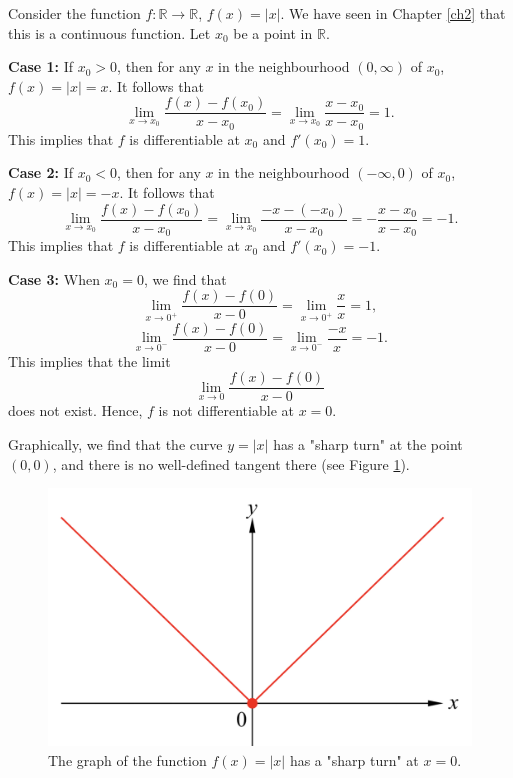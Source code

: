 \begin{example}[label=23021303]{}
Consider the function $f:\mathbb{R}\to\mathbb{R}$, $f(x)=|x|$. We have seen in Chapter \ref{ch2} that this is a continuous function. Let $x_0$ be a point in $\mathbb{R}$.

\textbf{Case 1:} If $x_0>0$, then for any $x$ in the neighbourhood $(0, \infty)$ of $x_0$, $f(x)=|x|=x$.  It follows that
\[\lim_{x\to x_0}\frac{f(x)-f(x_0)}{x-x_0}=\lim_{x\to x_0}\frac{x-x_0}{x-x_0}=1.\]
This implies that $f$ is differentiable at $x_0$ and $f'(x_0)=1$.

\textbf{Case 2:} If $x_0<0$, then for any $x$ in the neighbourhood $(-\infty, 0)$ of $x_0$, $f(x)=|x|=-x$.  It follows that 
\[\lim_{x\to x_0}\frac{f(x)-f(x_0)}{x-x_0}=\lim_{x\to x_0}\frac{-x-(-x_0)}{x-x_0}=-\frac{x-x_0}{x-x_0}=-1.\]
This implies that $f$ is differentiable at $x_0$ and $f'(x_0)=-1$.

\textbf{Case 3:} When $x_0=0$, we find that
\[\lim_{x\to 0^+}\frac{f(x)-f(0)}{x-0}=\lim_{x\to 0^+}\frac{x}{x}=1,\]
\[\lim_{x\to 0^-}\frac{f(x)-f(0)}{x-0}=\lim_{x\to 0^-}\frac{-x}{x}=-1.\]
This implies that the limit 
\[\lim_{x\to 0}\frac{f(x)-f(0)}{x-0}\] does not exist. Hence, $f$ is not differentiable at $x=0$.
\end{example}

Graphically, we find that the curve $y=|x|$ has a "sharp turn" at the point $(0,0)$, and there is no well-defined tangent there (see Figure \ref{figure19}).

 \begin{figure}[ht]
\centering
\includegraphics[scale=0.18]{Picture19.png}
\caption{  The graph of the function $f(x)=|x|$ has a "sharp turn" at $x=0$. \fa}\label{figure19}
\end{figure}

